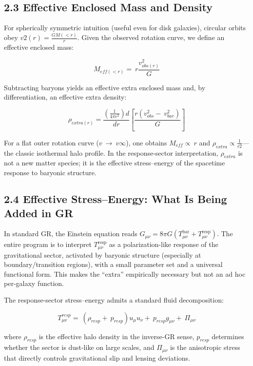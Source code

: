 \subsection{2.3 Effective Enclosed Mass and Density}\label{effective-enclosed-mass-and-density}

For spherically symmetric intuition (useful even for disk galaxies), circular orbits obey \(v2(r) = \frac{GM( < r)}{r}\). Given the observed rotation curve, we define an effective enclosed mass:

\[M_{eff( < r)} = \ r\frac{v_{obs(r)}^{2}}{G}\]

Subtracting baryons yields an effective extra enclosed mass and, by differentiation, an effective extra density:

\[\rho_{extra(r)} = \frac{\left( \frac{1}{4\pi r^{2}} \right)d}{dr}\left\lbrack \frac{r\left( v_{obs}^{2} - \ v_{bar}^{2} \right)}{G} \right\rbrack\]

For a flat outer rotation curve (\(v\  \rightarrow \ v\infty\)), one obtains \(M_{eff} \propto \ r\) and \(\rho_{extra} \propto \frac{1}{r2}\)---the classic isothermal halo profile. In the response-sector interpretation, \(\rho_{extra}\) is not a new matter species; it is the effective stress--energy of the spacetime response to baryonic structure.

\subsection{2.4 Effective Stress--Energy: What Is Being Added in GR}\label{effective-stressenergy-what-is-being-added-in-gr}

In standard GR, the Einstein equation reads \(G_{\mu\nu} = 8\pi G\left( T_{\mu\nu}^{\text{bar}} + T_{\mu\nu}^{\text{resp}} \right)\). The entire program is to interpret \(T_{\mu\nu}^{\text{resp}}\) as a polarization-like response of the gravitational sector, activated by baryonic structure (especially at boundary/transition regions), with a small parameter set and a universal functional form. This makes the ``extra'' empirically necessary but not an ad hoc per-galaxy function.

The response-sector stress--energy admits a standard fluid decomposition:

\[T^{resp}_{\mu\nu} = \ \left( \rho_{resp} + \ p_{resp} \right)u_{\mu}u_{\nu} + \ p_{resp}g_{\mu\nu} + \ \Pi_{\mu\nu}\]

where \(\rho_{resp}\) is the effective halo density in the inverse-GR sense, \(p_{resp}\) determines whether the sector is dust-like on large scales, and \(\Pi_{\mu\nu}\) is the anisotropic stress that directly controls gravitational slip and lensing deviations.

